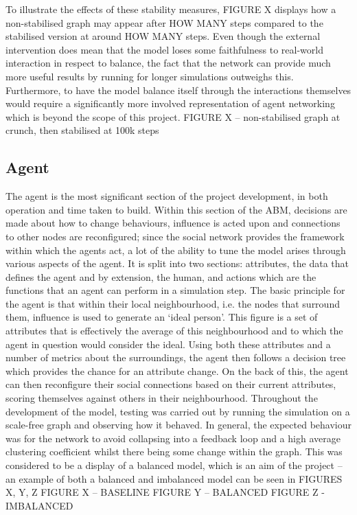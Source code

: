 \documentclass[]{report}
\begin{document}
To illustrate the effects of these stability measures, FIGURE X displays how a non-stabilised graph may appear after HOW MANY steps compared to the stabilised version at around HOW MANY steps. Even though the external intervention does mean that the model loses some faithfulness to real-world interaction in respect to balance, the fact that the network can provide much more useful results by running for longer simulations outweighs this. Furthermore, to have the model balance itself through the interactions themselves would require a significantly more involved representation of agent networking which is beyond the scope of this project.
FIGURE X – non-stabilised graph at crunch, then stabilised at 100k steps 

\subsection{Agent}
The agent is the most significant section of the project development, in both operation and time taken to build. Within this section of the ABM, decisions are made about how to change behaviours, influence is acted upon and connections to other nodes are reconfigured; since the social network provides the framework within which the agents act, a lot of the ability to tune the model arises through various aspects of the agent. It is split into two sections: attributes, the data that defines the agent and by extension, the human, and actions which are the functions that an agent can perform in a simulation step.
The basic principle for the agent is that within their local neighbourhood, i.e. the nodes that surround them, influence is used to generate an `ideal person'. This figure is a set of attributes that is effectively the average of this neighbourhood and to which the agent in question would consider the ideal. Using both these attributes and a number of metrics about the surroundings, the agent then follows a decision tree which provides the chance for an attribute change. On the back of this, the agent can then reconfigure their social connections based on their current attributes, scoring themselves against others in their neighbourhood.
Throughout the development of the model, testing was carried out by running the simulation on a scale-free graph and observing how it behaved. In general, the expected behaviour was for the network to avoid collapsing into a feedback loop and a high average clustering coefficient whilst there being some change within the graph. This was considered to be a display of a balanced model, which is an aim of the project – an example of both a balanced and imbalanced model can be seen in FIGURES X, Y, Z
FIGURE X – BASELINE
FIGURE Y – BALANCED
FIGURE Z - IMBALANCED
\end{document}
